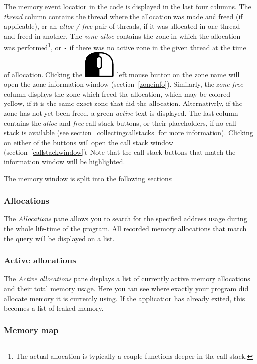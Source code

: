 \documentclass[hidelinks,titlepage,a4paper]{article}
\newcommand{\LMB}{\includegraphics[height=.8\baselineskip]{icons/lmb}}
\begin{document}
The memory event location in the code is displayed in the last four columns. The \emph{thread} column contains the thread where the allocation was made and freed (if applicable), or an \emph{alloc / free} pair of threads, if it was allocated in one thread and freed in another. The \emph{zone alloc} contains the zone in which the allocation was performed\footnote{The actual allocation is typically a couple functions deeper in the call stack.}, or \texttt{-} if there was no active zone in the given thread at the time of allocation. Clicking the \LMB{}~left mouse button on the zone name will open the zone information window (section~\ref{zoneinfo}). Similarly, the \emph{zone free} column displays the zone which freed the allocation, which may be colored yellow, if it is the same exact zone that did the allocation. Alternatively, if the zone has not yet been freed, a green \emph{active} text is displayed. The last column contains the \emph{alloc} and \emph{free} call stack buttons, or their placeholders, if no call stack is available (see section~\ref{collectingcallstacks} for more information). Clicking on either of the buttons will open the call stack window (section~\ref{callstackwindow}). Note that the call stack buttons that match the information window will be highlighted.

The memory window is split into the following sections:

\subsubsection{Allocations}

The \emph{\faAt{} Allocations} pane allows you to search for the specified address usage during the whole life-time of the program. All recorded memory allocations that match the query will be displayed on a list.

\subsubsection{Active allocations}

The \emph{\faHeartbeat{} Active allocations} pane displays a list of currently active memory allocations and their total memory usage. Here you can see where exactly your program did allocate memory it is currently using. If the application has already exited, this becomes a list of leaked memory.

\subsubsection{Memory map}
\end{document}
